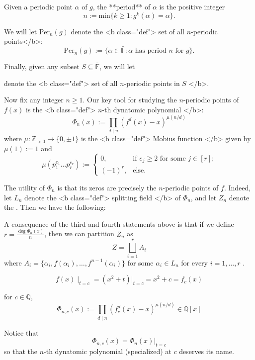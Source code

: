 Given a periodic point \( \alpha \) of \( g \), the **period** of \( \alpha \) is the positive integer 
\[ n:= \mathrm{min} \{ k \ge 1 : g^k (\alpha) = \alpha \}.\]


We will let \( \mathrm{Per}_{ n } (g)  \) denote the <b class="def"> set of all \( n \)-periodic points</b>: 
\[ \mathrm{Per}_{ n } (g) := \{ \alpha \in \bar{\mathbb{F}}  : \text{\(\alpha\) has period \(n\) for \(g\)}\}. \]

Finally, given any subset \( S \subseteq  \bar{\mathbb{F}}  \), we will let 

denote the <b class="def"> set of all \( n \)-periodic points in \( S \)  </b>. 

Now fix any integer \( n \ge 1 \). Our key tool for studying the \( n \)-periodic points of \( f(x) \) is the <b class="def"> \( n \)-th dynatomic polynomial </b>:
\[ 
 	 \Phi_{n  }  \left( x \right) := \prod_{d \mid n} \left( f^d(x) - x \right)^{\mu(n/d)}
\]
where \( \mu : \mathbb{Z}  _{>0} \to \{0 , \pm 1\} \) is the <b class="def"> Mobius function </b>  given by $\mu(1) := 1$ and 
	\[
		\mu \left( p_1^{e_1} \ldots p_r^{e_r} \right) :=
		\left\{ 
		 		\begin{array}{lc} 
		 			0, & \text{if $e_j \ge 2$ for some $j \in [r]$;} \\[0.5em]
		 			(-1)^r, & \text{else.} 
		 		\end{array}   
		 \right.  
	\]

The utility of \(  \Phi_{n  }  \) is that its zeros are precisely the \( n \)-periodic points of \( f \). Indeed, let \( L_n \) denote the <b class="def"> splitting field </b> of \(  \Phi_{n  }     \), and let \( Z_n \) denote the . Then we have the following: 

 A consequence of the third and fourth statements above is that if we define \( r= \frac{\deg  \Phi_{n  }  \left( x \right)}{n} \), then we can partition \( Z_n \) as 
 \[
  Z = \bigsqcup_{i=1}^{r} A_i
 \]
 where \( A_i = \{\alpha_i , f(\alpha_i) , \ldots , f^{n-1} (\alpha_i) \} \)  for some \( \alpha_i \in L_n \)  for every \( i = 1, \ldots , r \) .

\[ 
  f(x) \mid_{t = c}  = (x^2 +t)|_{t = c} = x^2 +c = f_c (x)
\] 

for \( c \in \mathbb{Q} \),  
\[
  \Phi_{n,c} (x)  :=  \prod_{d \mid n} \left( f_c^d (x) - x \right) ^{\mu(n/d)} \in \mathbb{Q} [x]
\]

Notice that 
\[ 
	 \Phi_{n ,c }  \left( x \right)     =  \Phi_{n  }  \left( x \right)    |_{t = c}
\]  
so that the \( n \)-th dynatomic polynomial (specialized) at \( c \) deserves its name.

